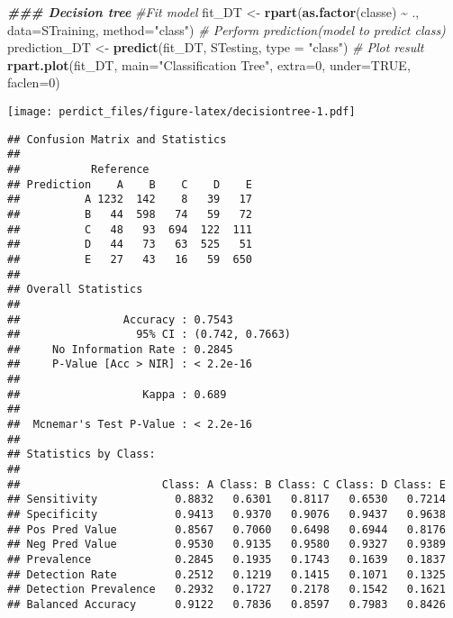 \documentclass[
]{article}
\newenvironment{Shaded}{\begin{snugshade}}{\end{snugshade}}
\newcommand{\AttributeTok}[1]{\textcolor[rgb]{0.13,0.29,0.53}{#1}}
\newcommand{\CommentTok}[1]{\textcolor[rgb]{0.56,0.35,0.01}{\textit{#1}}}
\newcommand{\ConstantTok}[1]{\textcolor[rgb]{0.56,0.35,0.01}{#1}}
\newcommand{\DecValTok}[1]{\textcolor[rgb]{0.00,0.00,0.81}{#1}}
\newcommand{\DocumentationTok}[1]{\textcolor[rgb]{0.56,0.35,0.01}{\textbf{\textit{#1}}}}
\newcommand{\FunctionTok}[1]{\textcolor[rgb]{0.13,0.29,0.53}{\textbf{#1}}}
\newcommand{\NormalTok}[1]{#1}
\newcommand{\OtherTok}[1]{\textcolor[rgb]{0.56,0.35,0.01}{#1}}
\newcommand{\SpecialCharTok}[1]{\textcolor[rgb]{0.81,0.36,0.00}{\textbf{#1}}}
\newcommand{\StringTok}[1]{\textcolor[rgb]{0.31,0.60,0.02}{#1}}
\begin{document}
\begin{Shaded}
\begin{Highlighting}[]
\DocumentationTok{\#\#\# Decision tree}
\CommentTok{\#Fit model}
\NormalTok{fit\_DT }\OtherTok{\textless{}{-}} \FunctionTok{rpart}\NormalTok{(}\FunctionTok{as.factor}\NormalTok{(classe) }\SpecialCharTok{\textasciitilde{}}\NormalTok{ ., }\AttributeTok{data=}\NormalTok{STraining, }\AttributeTok{method=}\StringTok{"class"}\NormalTok{)}
\CommentTok{\# Perform prediction(model to predict class)}
\NormalTok{prediction\_DT }\OtherTok{\textless{}{-}} \FunctionTok{predict}\NormalTok{(fit\_DT, STesting, }\AttributeTok{type =} \StringTok{"class"}\NormalTok{)}
\CommentTok{\# Plot result}
\FunctionTok{rpart.plot}\NormalTok{(fit\_DT, }\AttributeTok{main=}\StringTok{"Classification Tree"}\NormalTok{, }\AttributeTok{extra=}\DecValTok{0}\NormalTok{, }\AttributeTok{under=}\ConstantTok{TRUE}\NormalTok{, }\AttributeTok{faclen=}\DecValTok{0}\NormalTok{)}
\end{Highlighting}
\end{Shaded}

\texttt{[image: perdict\_files/figure-latex/decisiontree-1.pdf]}

\begin{Shaded}
\end{Shaded}

\begin{verbatim}
## Confusion Matrix and Statistics
## 
##           Reference
## Prediction    A    B    C    D    E
##          A 1232  142    8   39   17
##          B   44  598   74   59   72
##          C   48   93  694  122  111
##          D   44   73   63  525   51
##          E   27   43   16   59  650
## 
## Overall Statistics
##                                          
##                Accuracy : 0.7543         
##                  95% CI : (0.742, 0.7663)
##     No Information Rate : 0.2845         
##     P-Value [Acc > NIR] : < 2.2e-16      
##                                          
##                   Kappa : 0.689          
##                                          
##  Mcnemar's Test P-Value : < 2.2e-16      
## 
## Statistics by Class:
## 
##                      Class: A Class: B Class: C Class: D Class: E
## Sensitivity            0.8832   0.6301   0.8117   0.6530   0.7214
## Specificity            0.9413   0.9370   0.9076   0.9437   0.9638
## Pos Pred Value         0.8567   0.7060   0.6498   0.6944   0.8176
## Neg Pred Value         0.9530   0.9135   0.9580   0.9327   0.9389
## Prevalence             0.2845   0.1935   0.1743   0.1639   0.1837
## Detection Rate         0.2512   0.1219   0.1415   0.1071   0.1325
## Detection Prevalence   0.2932   0.1727   0.2178   0.1542   0.1621
## Balanced Accuracy      0.9122   0.7836   0.8597   0.7983   0.8426
\end{verbatim}
\end{document}
